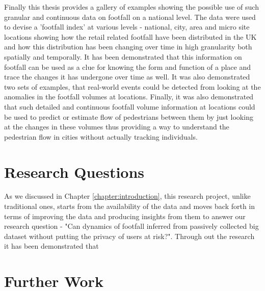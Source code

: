 Finally this thesis provides a gallery of examples showing the possible use of such granular and continuous data on footfall on a national level.
The data were used to devise a 'footfall index' at various levels - national, city, area and micro site locations showing how the retail related footfall have been distributed in the UK and how this distribution has been changing over time in high granularity both spatially and temporally.
It has been demonstrated that this information on footfall can be used as a clue for knowing the form and function of a place and trace the changes it has undergone over time as well.
It was also demonstrated two sets of examples, that real-world events could be detected from looking at the anomalies in the footfall volumes at locations.
Finally, it was also demonstrated that such detailed and continuous footfall volume information at locations could be used to predict or estimate flow of pedestrians between them by just looking at the changes in these volumes thus providing a way to understand the pedestrian flow in cities without actually tracking individuals.

\section{Research Questions}

As we discussed in Chapter \ref{chapter:introduction}, this research project, unlike traditional ones, starts from the availability of the data and moves back forth in terms of improving the data and producing insights from them to answer our research question - "Can dynamics of footfall inferred from passively collected big dataset without putting the privacy of users at risk?". Through out the research it has been demonstrated that


\section{Further Work}



